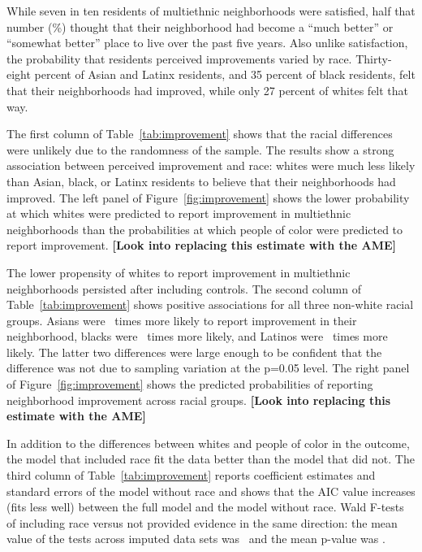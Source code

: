 \documentclass{baderart}
\begin{document}
While seven in ten residents of multiethnic neighborhoods were satisfied, half that number (\meanimproved \%) thought that their neighborhood had become a ``much better'' or ``somewhat better'' place to live over the past five years. Also unlike satisfaction, the probability that residents perceived improvements varied by race. Thirty-eight percent of Asian and Latinx residents, and 35 percent of black residents, felt that their neighborhoods had improved, while only 27 percent of whites felt that way.

The first column of Table~\ref{tab:improvement} shows that the racial differences were unlikely due to the randomness of the sample. The results show a strong association between perceived improvement and race: whites were much less likely than Asian, black, or Latinx residents to believe that their neighborhoods had improved. The left panel of Figure~\ref{fig:improvement} shows the lower probability at which whites were predicted to report improvement in multiethnic neighborhoods than the probabilities at which people of color were predicted to report improvement. \textbf{{[}Look into replacing this estimate with the AME{]}}


The lower propensity of whites to report improvement in multiethnic neighborhoods persisted after including controls. The second column of Table~\ref{tab:improvement} shows positive associations for all three non-white racial groups. Asians were \apibetter~times more likely to report improvement in their neighborhood, blacks were \nhbbetter~times more likely, and Latinos were \hspbetter~times more likely. The latter two differences were large enough to be confident that the difference was not due to sampling variation at the p=0.05 level. The right panel of Figure~\ref{fig:improvement} shows the predicted probabilities of reporting neighborhood improvement across racial groups. \textbf{{[}Look into replacing this estimate with the AME{]}}


In addition to the differences between whites and people of color in the outcome, the model that included race fit the data better than the model that did not. The third column of Table~\ref{tab:improvement} reports coefficient estimates and standard errors of the model without race and shows that the AIC value increases (fits less well) between the full model and the model without race. Wald F-tests of including race versus not provided evidence in the same direction: the mean value of the tests across imputed data sets was \betWaldF~and the mean p-value was \betWaldp.
\end{document}
